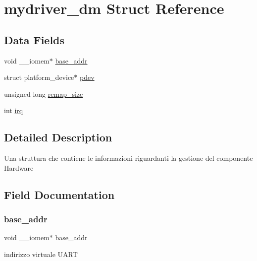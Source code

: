 \hypertarget{structmydriver__dm}{}\section{mydriver\+\_\+dm Struct Reference}
\label{structmydriver__dm}
\subsection*{Data Fields}
\textbf{ }\par
\begin{DoxyCompactItemize}
\item 
void \+\_\+\+\_\+iomem$\ast$ \hyperlink{structmydriver__dm_af99ae6247be83b6520e972363345a486}{base\+\_\+addr}
\item 
struct platform\+\_\+device$\ast$ \hyperlink{structmydriver__dm_a6fb27e0c8e2d8544acca44725266b5d3}{pdev}
\item 
unsigned long \hyperlink{structmydriver__dm_a0c549abf29e1024c458fe99717714be1}{remap\+\_\+size}
\item 
int \hyperlink{structmydriver__dm_aea22ec27eb52d3e0d744184067cbca3a}{irq}
\end{DoxyCompactItemize}



\subsection{Detailed Description}
Una struttura che contiene le informazioni riguardanti la gestione del componente Hardware 

\subsection{Field Documentation}
\mbox{\label{structmydriver__dm_af99ae6247be83b6520e972363345a486}} 
\subsubsection{\texorpdfstring{base\+\_\+addr}{base\_addr}}
{\footnotesize\ttfamily void \+\_\+\+\_\+iomem$\ast$ base\+\_\+addr}

indirizzo virtuale U\+A\+RT \mbox{\label{structmydriver__dm_aea22ec27eb52d3e0d744184067cbca3a}} 
